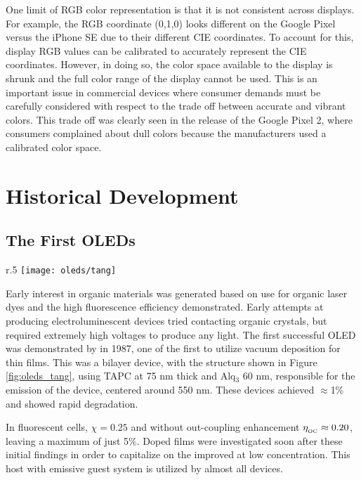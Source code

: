 \documentclass[../thesis.tex]{subfiles}
\begin{document}
One limit of RGB color representation is that it is not consistent across displays.
For example, the RGB coordinate (0,1,0) looks different on the Google Pixel versus the iPhone SE due to their different CIE coordinates.
To account for this, display RGB values can be calibrated to accurately represent the CIE coordinates.
However, in doing so, the color space available to the display is shrunk and the full color range of the display cannot be used.
This is an important issue in commercial devices where consumer demands must be carefully considered with respect to the trade off between accurate and vibrant colors.
This trade off was clearly seen in the release of the Google Pixel 2, where consumers complained about dull colors because the manufacturers used a calibrated color space.\supercite{Bohn2017}

\section{Historical Development}\label{sec:oled_history}
\subsection{The First OLEDs}

\begin{wrapfigure}{r}{.5\textwidth}
\texttt{[image: oleds/tang]}
\caption{Structure of the first OLED cell from \textcite{Tang1987}.  Diamine is commonly referred to now as TAPC.}
\label{fig:oleds_tang}
\end{wrapfigure}

Early interest in organic materials was generated based on use for organic laser dyes and the high fluorescence efficiency demonstrated.\supercite{Venkataraman1971,Schafer1977,Dresner1969}
Early attempts at producing electroluminescent devices tried contacting organic crystals, but required extremely high voltages to produce any light.\supercite{Williams1970,Helfrich1965}
The first successful OLED was demonstrated by \textcite{Tang1987} in 1987, one of the first to utilize vacuum deposition for thin films.
This was a bilayer device, with the structure shown in Figure \ref{fig:oleds_tang}, using TAPC at 75 nm thick and Alq$_3$ 60 nm, responsible for the emission of the device, centered around 550 nm.
These devices achieved \eqe $\approx$1\% and showed rapid degradation.

In fluorescent cells, $\chi=0.25$ and without out-coupling enhancement $\eta_{_\text{\tiny OC}} \approx 0.20$, leaving a maximum \eqe of just 5\%.
Doped films were investigated soon after these initial findings in order to capitalize on the improved \pl at low concentration.\supercite{Tang1989a}
This host with emissive guest system is utilized by almost all devices.
\end{document}

